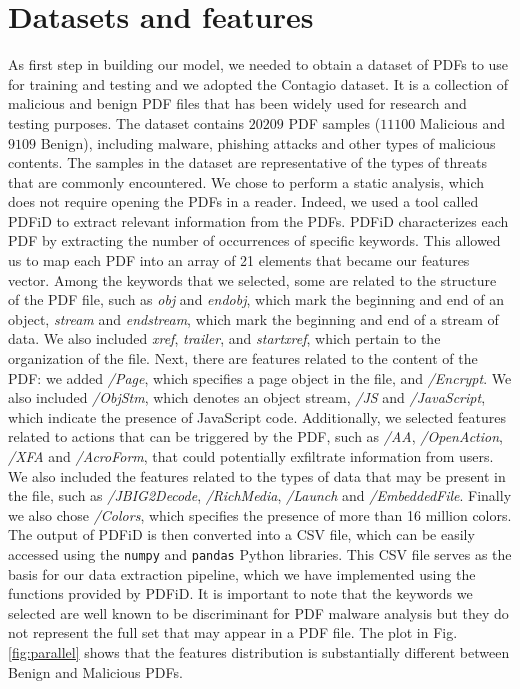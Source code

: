 \documentclass[twocolumn, switch]{article} %
\begin{document}
\section{Datasets and features}
\label{sec:datasetsandfeatures}
As first step in building our model, we needed to obtain a dataset of PDFs to use for training and testing and we adopted the Contagio dataset. It is a collection of malicious and benign PDF files that has been widely used for research and testing purposes. The dataset contains $20209$ PDF samples ($11100$ Malicious and $9109$ Benign), including malware, phishing attacks and other types of malicious contents. The samples in the dataset are representative of the types of threats that are commonly encountered.\newline
We chose to perform a static analysis, which does not require opening the PDFs in a reader. Indeed, we used a tool called PDFiD to extract relevant information from the PDFs. PDFiD characterizes each PDF by extracting the number of occurrences of specific keywords. This allowed us to map each PDF into an array of 21 elements that became our features vector.\newline
Among the keywords that we selected, some are related to the structure of the PDF file, such as \textit{obj} and \textit{endobj}, which mark the beginning and end of an object, \textit{stream} and \textit{endstream}, which mark the beginning and end of a stream of data. We also included \textit{xref}, \textit{trailer}, and \textit{startxref}, which pertain to the organization of the file. Next, there are features related to the content of the PDF: we added \textit{/Page}, which specifies a page object in the file, and \textit{/Encrypt}. We also included \textit{/ObjStm}, which denotes an object stream, \textit{/JS} and \textit{/JavaScript}, which indicate the presence of JavaScript code. Additionally, we selected features related to actions that can be triggered by the PDF, such as \textit{/AA}, \textit{/OpenAction}, \textit{/XFA} and \textit{/AcroForm}, that could potentially exfiltrate information from users. We also included the features related to the types of data that may be present in the file, such as \textit{/JBIG2Decode}, \textit{/RichMedia}, \textit{/Launch} and \textit{/EmbeddedFile}. Finally we also chose \textit{/Colors}, which specifies the presence of more than 16 million colors.\newline
The output of PDFiD is then converted into a CSV file, which can be easily accessed using the \texttt{numpy} and \texttt{pandas} Python libraries. This CSV file serves as the basis for our data extraction pipeline, which we have implemented using the functions provided by PDFiD. It is important to note that the keywords we selected are well known to be discriminant for PDF malware analysis but they do not represent the full set that may appear in a PDF file.\newline
The plot in Fig. \ref{fig:parallel} shows that the features distribution is substantially different between Benign and Malicious PDFs.
\end{document}
